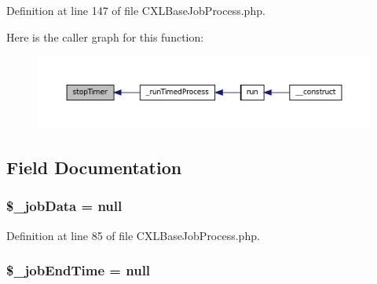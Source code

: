 Definition at line 147 of file CXLBaseJobProcess.php.








Here is the caller graph for this function:\nopagebreak
\begin{figure}[H]
\begin{center}
\leavevmode
\includegraphics[width=400pt]{classCXLBaseJobProcess_a013c0d9ca789c13c56b13cb96d26174a_icgraph}
\end{center}
\end{figure}




\subsection{Field Documentation}
\hypertarget{classCXLBaseJobProcess_ae1b0920bc764db03028e914f2be8c328}{
\subsubsection[{\$\_\-jobData}]{\setlength{\rightskip}{0pt plus 5cm}\$\_\-jobData = null}}
\label{classCXLBaseJobProcess_ae1b0920bc764db03028e914f2be8c328}


Definition at line 85 of file CXLBaseJobProcess.php.

\hypertarget{classCXLBaseJobProcess_a5192e6d60c6569eb1cda1db703de424c}{
\subsubsection[{\$\_\-jobEndTime}]{\setlength{\rightskip}{0pt plus 5cm}\$\_\-jobEndTime = null}}
\label{classCXLBaseJobProcess_a5192e6d60c6569eb1cda1db703de424c}


